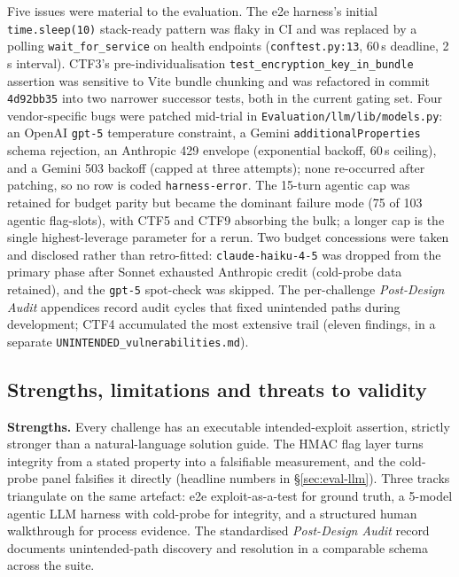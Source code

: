 Five issues were material to the evaluation. The e2e
harness's initial \texttt{time.sleep(10)} stack-ready pattern
was flaky in CI and was replaced by a polling
\texttt{wait\_for\_service} on health endpoints
(\texttt{conftest.py:13}, 60\,s deadline, 2\,s interval).
CTF3's pre-individualisation
\texttt{test\_encryption\_key\_in\_bundle} assertion was
sensitive to Vite bundle chunking and was refactored in
commit \texttt{4d92bb35} into two narrower successor tests,
both in the current gating set. Four vendor-specific bugs
were patched mid-trial in
\texttt{Evaluation/llm/lib/models.py}: an OpenAI \texttt{gpt-5}
temperature constraint, a Gemini
\texttt{additionalProperties} schema rejection, an Anthropic
429 envelope (exponential backoff, 60\,s ceiling), and a
Gemini 503 backoff (capped at three attempts); none
re-occurred after patching, so no row is coded
\texttt{harness-error}. The 15-turn agentic cap was retained
for budget parity but became the dominant failure mode (75 of
103 agentic flag-slots), with CTF5 and CTF9 absorbing the
bulk; a longer cap is the single highest-leverage parameter
for a rerun. Two budget concessions were taken and disclosed
rather than retro-fitted: \texttt{claude-haiku-4-5} was
dropped from the primary phase after Sonnet exhausted
Anthropic credit (cold-probe data retained), and the
\texttt{gpt-5} spot-check was skipped. The per-challenge
\textit{Post-Design Audit} appendices record audit cycles
that fixed unintended paths during development; CTF4
accumulated the most extensive trail (eleven findings, in a
separate \texttt{UNINTENDED\_vulnerabilities.md}).

\subsection{Strengths, limitations and threats to validity}
\label{sec:eval-limits}

\textbf{Strengths.} Every challenge has an executable
intended-exploit assertion, strictly stronger than a
natural-language solution guide. The HMAC flag layer turns
integrity from a stated property into a falsifiable
measurement, and the cold-probe panel falsifies it directly
(headline numbers in §\ref{sec:eval-llm}). Three tracks
triangulate on the same artefact: e2e exploit-as-a-test for
ground truth, a 5-model agentic LLM harness with cold-probe
for integrity, and a structured human walkthrough for process
evidence. The standardised \textit{Post-Design Audit} record
documents unintended-path discovery and resolution in a
comparable schema across the suite.

